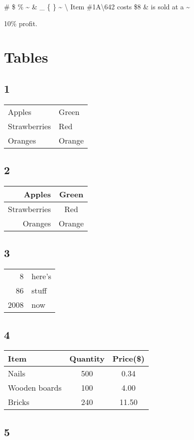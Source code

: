\documentclass[a4paper,12pt]{report}
\begin{document}
\#
\$
\%
\~{}
\&
\_
\{
\}
\~{}
\textbackslash
\newline Item \#1A\textbackslash642 costs \$8 \& is sold at a \~{}{10\% profit.

\section{Tables}

\subsection{1}
\begin{tabular}{|l|l|}
Apples & Green \\
Strawberries & Red \\
Oranges & Orange \\
\end{tabular}
\subsection{2}
\begin{tabular}{rc}
Apples & Green \\
\hline
Strawberries & Red \\
\cline{1-1}
Oranges & Orange \\
\end{tabular}
\subsection{3}
\begin{tabular}{|r|l|}
\hline
8 & here’s \\
\cline{2-2}
86 & stuff \\
\hline \hline
2008 & now \\
\hline
\end{tabular}
\subsection{4}
\begin{tabular}{l|c|c}
Item & Quantity & Price(\$) \\
\hline
Nails & 500 & 0.34 \\
Wooden boards & 100 & 4.00 \\
Bricks & 240 & 11.50
\end{tabular}
\subsection{5}
\begin{tabular}{l|ccc}


\end{tabular}}
\end{document}

